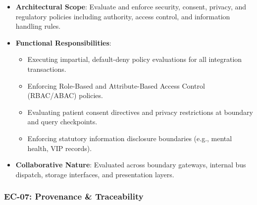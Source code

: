 \begin{itemize}

\item 
\textbf{Architectural Scope}: Evaluate and enforce security, consent, privacy, and regulatory policies including authority, access control, and information handling rules.



\item 
\textbf{Functional Responsibilities}:


\begin{itemize}

\item 
Executing impartial, default-deny policy evaluations for all integration transactions.



\item 
Enforcing Role-Based and Attribute-Based Access Control (RBAC/\allowbreak{}ABAC) policies.



\item 
Evaluating patient consent directives and privacy restrictions at boundary and query checkpoints.



\item 
Enforcing statutory information disclosure boundaries (e.g., mental health, VIP records).



\end{itemize}


\item 
\textbf{Collaborative Nature}: Evaluated across boundary gateways, internal bus dispatch, storage interfaces, and presentation layers.



\end{itemize}
\label{rad:enterprise:157}
\subsubsection*{EC-07: Provenance \& Traceability}
\label{rad:enterprise:158}


